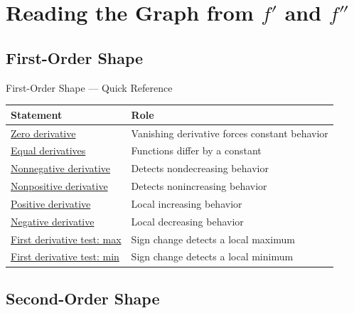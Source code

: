 \section{\texorpdfstring{Reading the Graph from \(f'\) and \(f''\)}{Reading the Graph from f' and f''}}

\subsection{First-Order Shape}

\begin{toolkitbox}{First-Order Shape --- Quick Reference}
\small
\begin{tabular}{l l}
\toprule
\textbf{Statement} & \textbf{Role} \\
\midrule
\hyperref[thm:zero-derivative-implies-constant]{Zero derivative} & Vanishing derivative forces constant behavior \\
\hyperref[cor:equal-derivatives-constant-difference]{Equal derivatives} & Functions differ by a constant \\
\hyperref[thm:nondecreasing-iff-nonneg-derivative]{Nonnegative derivative} & Detects nondecreasing behavior \\
\hyperref[thm:nonincreasing-iff-nonpos-derivative]{Nonpositive derivative} & Detects nonincreasing behavior \\
\hyperref[lem:positive-derivative-implies-locally-increasing]{Positive derivative} & Local increasing behavior \\
\hyperref[lem:negative-derivative-implies-locally-decreasing]{Negative derivative} & Local decreasing behavior \\
\hyperref[thm:first-derivative-test-maximum]{First derivative test: max} & Sign change detects a local maximum \\
\hyperref[thm:first-derivative-test-minimum]{First derivative test: min} & Sign change detects a local minimum \\
\bottomrule
\end{tabular}
\end{toolkitbox}



\subsection{Second-Order Shape}

